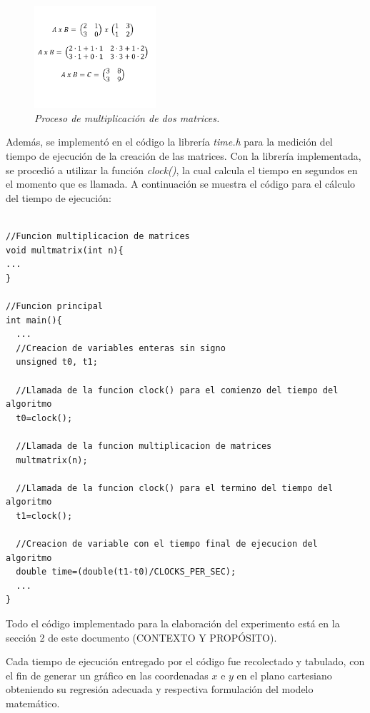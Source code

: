 \documentclass[11pt, twocolumn]{llncs}
\begin{document}
\begin{figure}
\caption{\textit{\label{fig:multiplicacion}Proceso de multiplicación de dos matrices.}}
\centering
\includegraphics[width=0.4\textwidth]{multiplicacion.png}
\end{figure}

Además, se implementó en el código la librería \textit{time.h} para la medición del tiempo de ejecución de la creación de las matrices. Con la librería implementada, se procedió a utilizar la función \textit{clock()}, la cual calcula el tiempo en segundos en el momento que es llamada. A continuación se muestra el código para el cálculo del tiempo de ejecución:

\lstset{language=, breaklines=true, basicstyle=\footnotesize}
\begin{lstlisting}[frame=single]

//Funcion multiplicacion de matrices
void multmatrix(int n){
...
}

//Funcion principal
int main(){
  ...
  //Creacion de variables enteras sin signo
  unsigned t0, t1;
  
  //Llamada de la funcion clock() para el comienzo del tiempo del algoritmo
  t0=clock();
  
  //Llamada de la funcion multiplicacion de matrices
  multmatrix(n);
  
  //Llamada de la funcion clock() para el termino del tiempo del algoritmo
  t1=clock();
  
  //Creacion de variable con el tiempo final de ejecucion del algoritmo
  double time=(double(t1-t0)/CLOCKS_PER_SEC);
  ...
}
\end{lstlisting}

Todo el código implementado para la elaboración del experimento está en la sección 2 de este documento (CONTEXTO Y PROPÓSITO).

Cada tiempo de ejecución entregado por el código fue recolectado y tabulado, con el fin de generar un gráfico en las coordenadas $x$ e $y$ en el plano cartesiano obteniendo su regresión adecuada y respectiva formulación del modelo matemático.
\end{document}

